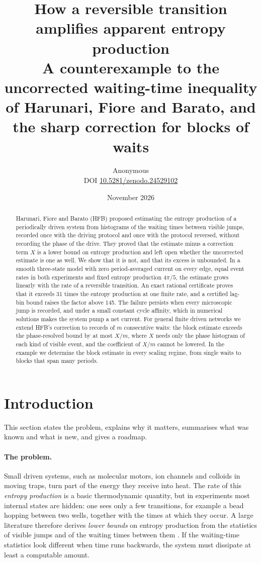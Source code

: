 \documentclass[11pt,a4paper]{article}
\title{\bfseries How a reversible transition amplifies apparent entropy production\\[4pt]
\large A counterexample to the uncorrected waiting-time inequality of Harunari, Fiore and Barato, and the sharp correction for blocks of waits}
\author{Anonymous\\[3pt]{\small DOI \href{https://doi.org/10.5281/zenodo.24529102}{10.5281/zenodo.24529102}}}
\date{November 2026}
\begin{document}
\maketitle
\begin{abstract}
Harunari, Fiore and Barato (HFB) proposed estimating the entropy production of a periodically driven system from histograms of the waiting times between visible jumps, recorded once with the driving protocol and once with the protocol reversed, without recording the phase of the drive. They proved that the estimate minus a correction term $X$ is a lower bound on entropy production and left open whether the uncorrected estimate is one as well. We show that it is not, and that its excess is unbounded. In a smooth three-state model with zero period-averaged current on every edge, equal event rates in both experiments and fixed entropy production $4\pi/5$, the estimate grows linearly with the rate of a reversible transition. An exact rational certificate proves that it exceeds 31 times the entropy production at one finite rate, and a certified lag-bin bound raises the factor above 145. The failure persists when every microscopic jump is recorded, and under a small constant cycle affinity, which in numerical solutions makes the system pump a net current. For general finite driven networks we extend HFB's correction to records of $m$ consecutive waits: the block estimate exceeds the phase-resolved bound by at most $X/m$, where $X$ needs only the phase histogram of each kind of visible event, and the coefficient of $X/m$ cannot be lowered. In the example we determine the block estimate in every scaling regime, from single waits to blocks that span many periods.
\end{abstract}

\section{Introduction}
This section states the problem, explains why it matters, summarises what was known and what is new, and gives a roadmap.

\paragraph{The problem.} Small driven systems, such as molecular motors, ion channels and colloids in moving traps, turn part of the energy they receive into heat. The rate of this \emph{entropy production} is a basic thermodynamic quantity, but in experiments most internal states are hidden: one sees only a few transitions, for example a bead hopping between two wells, together with the times at which they occur. A large literature therefore derives \emph{lower bounds} on entropy production from the statistics of visible jumps and of the waiting times between them \cite{vandermeer,harunari2022,skinner,martinez,snippets}. If the waiting-time statistics look different when time runs backwards, the system must dissipate at least a computable amount.
\end{document}

